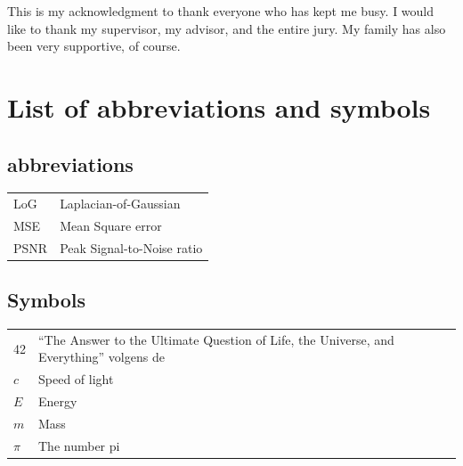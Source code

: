 \documentclass[master=eelt,masteroption=ec]{kulemt}
\begin{document}
\begin{preface}
This is my acknowledgment to thank everyone who has kept me busy.
I would like to thank my supervisor, my advisor, and the entire jury.
My family has also been very supportive, of course.
\end{preface}

\tableofcontents*

\begin{abstract}
  This \texttt{abstract} environment provides a summary of the work, which may or may not be extensive.
The intention is that this should be limited to 1 page.

  \lipsum[1]
\end{abstract}

\listoffiguresandtables
\chapter{List of abbreviations and symbols}
\section*{abbreviations}
\begin{flushleft}
  \renewcommand{\arraystretch}{1.1}
  \begin{tabularx}{\textwidth}{@{}p{12mm}X@{}}
    LoG   & Laplacian-of-Gaussian \\
    MSE   & Mean Square error \\
    PSNR  & Peak Signal-to-Noise ratio \\
  \end{tabularx}
\end{flushleft}
\section*{Symbols}
\begin{flushleft}
  \renewcommand{\arraystretch}{1.1}
  \begin{tabularx}{\textwidth}{@{}p{12mm}X@{}}
    42    & ``The Answer to the Ultimate Question of Life, the Universe,
            and Everything'' volgens de \cite{h2g2} \\
    $c$   & Speed of light \\
    $E$   & Energy \\
    $m$   & Mass \\
    $\pi$ & The number pi \\
  \end{tabularx}
\end{flushleft}
\end{document}
